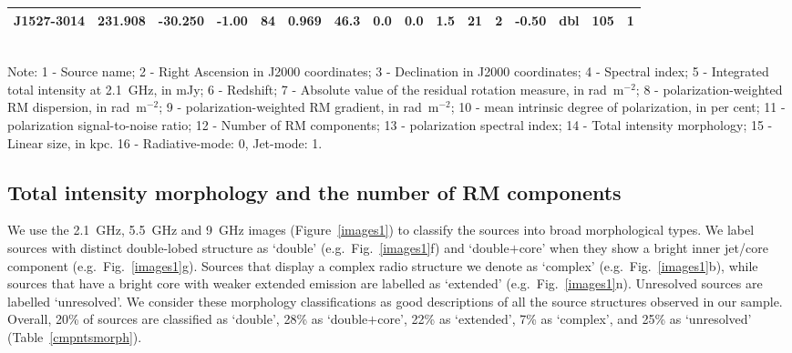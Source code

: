 \documentclass{mnras}
\begin{document}
{\begin{table*}
\begin{tabular}{cccccccccccccccc}
J1527-3014 & 231.908 & -30.250 & -1.00 & 84 & 0.969 & 46.3 & 0.0 & 0.0 & 1.5 & 21 & 2 & -0.50 & dbl & 105 & 1 \\ 
      \hline
   \end{tabular} \\ %
\scriptsize{Note: 1 - Source name; 2 - Right Ascension in J2000 coordinates; 3 - Declination in J2000 coordinates; 4 - Spectral index; 5 - Integrated total intensity at 2.1~GHz, in mJy; 
                    6 - Redshift; 7 - Absolute value of the residual rotation measure, in rad~m$^{-2}$; 8 - polarization-weighted RM dispersion, in rad~m$^{-2}$; 
                    9 - polarization-weighted RM gradient, in rad~m$^{-2}$; 10 - mean intrinsic degree of polarization, in per cent; 11 - polarization signal-to-noise ratio; 12 - Number of RM components; 
                    13 - polarization spectral index; 14 - Total intensity morphology; 15 - Linear size, in kpc. 16 - Radiative-mode: 0, Jet-mode: 1.}
\end{table*}
}



\subsection{Total intensity morphology and the number of RM components}
We use the 2.1~GHz, 5.5~GHz and 9~GHz images (Figure~\ref{images1}) to classify the sources into broad morphological types. We label sources with distinct double-lobed structure as `double' (e.g.~Fig.~\ref{images1}f) and `double$+$core' when they show a bright inner jet/core component (e.g.~Fig.~\ref{images1}g). Sources that display a complex radio structure we denote as `complex' (e.g.~Fig.~\ref{images1}b), while sources that have a bright core with weaker extended emission are labelled as `extended' (e.g.~Fig.~\ref{images1}n). Unresolved sources are labelled `unresolved'. We consider these morphology classifications as good descriptions of all the source structures observed in our sample. 
Overall, 20\% of sources are classified as `double', 28\% as `double$+$core', 22\% as `extended', 7\% as `complex', and 25\% as `unresolved' (Table~\ref{cmpntsmorph}). 
\end{document}
